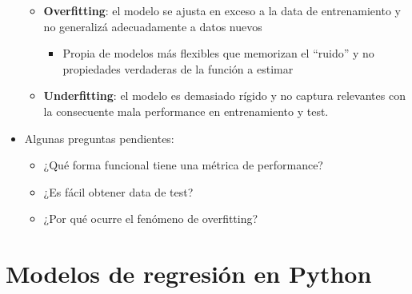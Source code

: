 \documentclass[leqno, 10pt, envcountsect]{beamer}
\numberwithin{equation}{section}
\theoremstyle{definition}
\theoremstyle{example}
\numberwithin{figure}{section}
\numberwithin{table}{section}
\let\olditem\item
\renewcommand{\item}{%
\olditem\vspace{1pt}}
\begin{document}
\begin{frame}
\begin{itemize}
\begin{itemize}
            \item \textbf{Overfitting}: el modelo se ajusta en exceso a la data
              de entrenamiento y no generalizá adecuadamente a datos nuevos
              \begin{itemize}
                \item Propia de modelos más flexibles que memorizan el
                  \enquote{ruido} y no propiedades verdaderas de la función a
                  estimar
              \end{itemize}
            \item \textbf{Underfitting}: el modelo es demasiado rígido y no
              captura relevantes con la consecuente mala performance en
              entrenamiento y test.
        \end{itemize}
    \item Algunas preguntas pendientes:
      \begin{itemize}
    \item ¿Qué forma funcional tiene una métrica de performance?
    \item ¿Es fácil obtener data de test?
    \item ¿Por qué ocurre el fenómeno de overfitting?
      \end{itemize}
  \end{itemize}
\end{frame}

\section{Modelos de regresión en Python}
\label{sec:modelos_de_regresion_en_python}
\end{document}
